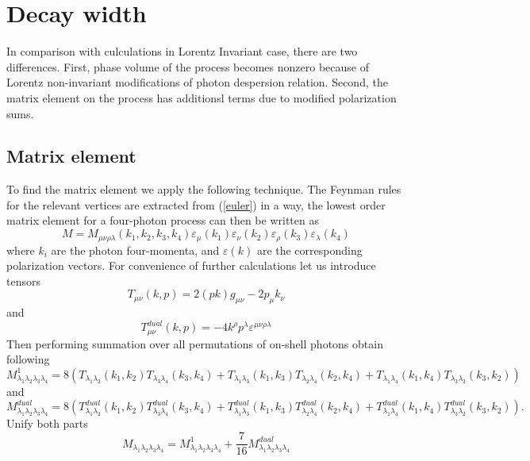 \documentclass[12pt]{article}
\begin{document}
\section{Decay width}
In comparison with culculations in Lorentz Invariant case, there are two differences. First, phase volume of the process becomes nonzero because of Lorentz non-invariant modifications of photon despersion relation. 
Second, the matrix element on the process has additionsl terms due to modified polarization sums. 
\subsection{Matrix element}
To find the matrix element we apply the following technique.
The Feynman rules for the relevant vertices are extracted from (\ref{euler}) in a way, the lowest order matrix element for a four-photon process can then be written as
   \begin{equation}
        M = M_{\mu\nu\rho\lambda}(k_1,k_2,k_3,k_4) \varepsilon_\mu(k_1) \varepsilon_\nu (k_2)\varepsilon_\rho(k_3) \varepsilon_\lambda(k_4)
    \end{equation}
where $k_i$ are the photon four-momenta, and $\varepsilon(k)$ are the corresponding polarization
vectors.    
For convenience of further calculations let us introduce tensors
\begin{equation}
    T_{\mu\nu}(k,p) = 2 (pk)g_{\mu\nu} - 2 p_\mu k_\nu
\end{equation}
and
\begin{equation}
    T^{dual}_{\mu\nu}(k,p) = - 4 k^{\rho}p^{\lambda} \varepsilon^{\mu\nu\rho\lambda}
\end{equation}
Then performing summation over all permutations of on-shell photons obtain following
\begin{equation}
  M^1_{\lambda_1\lambda_2\lambda_3\lambda_4}=8(T_{\lambda_1\lambda_2}(k_1,k_2)T_{\lambda_3\lambda_4}(k_3,k_4) + T_{\lambda_1\lambda_3}(k_1,k_3)T_{\lambda_2\lambda_4}(k_2,k_4) + T_{\lambda_1\lambda_4}(k_1,k_4)T_{\lambda_3\lambda_2}(k_3,k_2) )
\end{equation}
and
\begin{equation}
  M^{dual}_{\lambda_1\lambda_2\lambda_3\lambda_4}=8(T^{dual}_{\lambda_1\lambda_2}(k_1,k_2)T^{dual}_{\lambda_3\lambda_4}(k_3,k_4) + T^{dual}_{\lambda_1\lambda_3}(k_1,k_3)T^{dual}_{\lambda_2\lambda_4}(k_2,k_4) + T^{dual}_{\lambda_1\lambda_4}(k_1,k_4)T^{dual}_{\lambda_3\lambda_2}(k_3,k_2) ).
\end{equation}
Unify both parts
\begin{equation}
  M_{\lambda_1\lambda_2\lambda_3\lambda_4}=  M^1_{\lambda_1\lambda_2\lambda_3\lambda_4} + \frac{7}{16} M^{dual}_{\lambda_1\lambda_2\lambda_3\lambda_4}
\end{equation}
\end{document}
